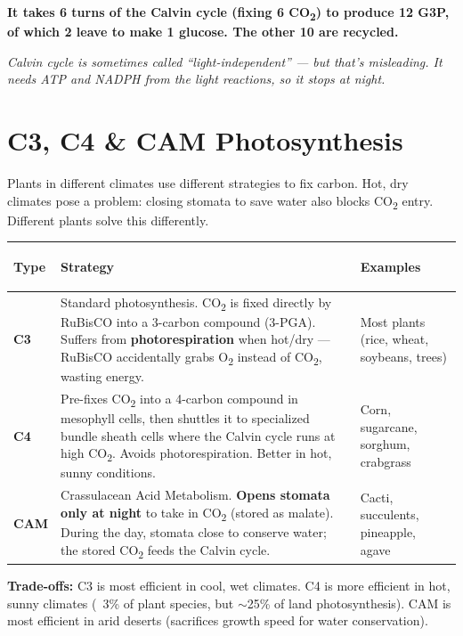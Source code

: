 \documentclass[11pt, letterpaper]{article}
\begin{document}
\textbf{It takes 6 turns of the Calvin cycle (fixing 6 CO\textsubscript{2}) to produce 12 G3P, of which 2 leave to make 1 glucose. The other 10 are recycled.}

\textit{Calvin cycle is sometimes called ``light-independent'' --- but that's misleading. It needs ATP and NADPH from the light reactions, so it stops at night.}

\section*{C3, C4 \& CAM Photosynthesis}

Plants in different climates use different strategies to fix carbon. Hot, dry climates pose
a problem: closing stomata to save water also blocks CO\textsubscript{2} entry. Different
plants solve this differently.

\noindent
{\renewcommand{\arraystretch}{1.6}
\begin{tabularx}{\textwidth}{>{\bfseries\raggedright\arraybackslash}p{1.5cm}
                              >{\raggedright\arraybackslash}X
                              >{\raggedright\arraybackslash}p{3cm}}
\toprule
\rowcolor{tableheaderteal}
\textbf{Type} & \textbf{Strategy} & \textbf{Examples} \\
\midrule
\rowcolor{rowTe} \textbf{C3} & Standard photosynthesis. CO\textsubscript{2} is fixed directly by RuBisCO into a 3-carbon compound (3-PGA). Suffers from \textbf{photorespiration} when hot/dry --- RuBisCO accidentally grabs O\textsubscript{2} instead of CO\textsubscript{2}, wasting energy. & Most plants (rice, wheat, soybeans, trees) \\
\rowcolor{rowA}  \textbf{C4} & Pre-fixes CO\textsubscript{2} into a 4-carbon compound in mesophyll cells, then shuttles it to specialized bundle sheath cells where the Calvin cycle runs at high CO\textsubscript{2}. Avoids photorespiration. Better in hot, sunny conditions. & Corn, sugarcane, sorghum, crabgrass \\
\rowcolor{rowTe} \textbf{CAM} & Crassulacean Acid Metabolism. \textbf{Opens stomata only at night} to take in CO\textsubscript{2} (stored as malate). During the day, stomata close to conserve water; the stored CO\textsubscript{2} feeds the Calvin cycle. & Cacti, succulents, pineapple, agave \\
\bottomrule
\end{tabularx}}

\textbf{Trade-offs:} C3 is most efficient in cool, wet climates. C4 is more efficient in hot,
sunny climates (~3\% of plant species, but $\sim$25\% of land photosynthesis). CAM is most
efficient in arid deserts (sacrifices growth speed for water conservation).
\end{document}
